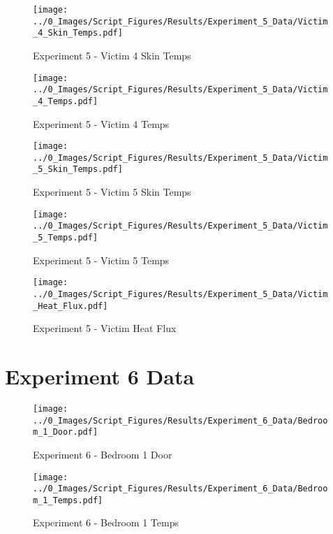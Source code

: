 	\begin{figure}[H]
		\centering
		\texttt{[image: ../0\_Images/Script\_Figures/Results/Experiment\_5\_Data/Victim\_4\_Skin\_Temps.pdf]}
		\caption[]{Experiment 5 - Victim 4 Skin Temps}
	\end{figure}
 
	\clearpage

	\begin{figure}[H]
		\centering
		\texttt{[image: ../0\_Images/Script\_Figures/Results/Experiment\_5\_Data/Victim\_4\_Temps.pdf]}
		\caption[]{Experiment 5 - Victim 4 Temps}
	\end{figure}
 

	\begin{figure}[H]
		\centering
		\texttt{[image: ../0\_Images/Script\_Figures/Results/Experiment\_5\_Data/Victim\_5\_Skin\_Temps.pdf]}
		\caption[]{Experiment 5 - Victim 5 Skin Temps}
	\end{figure}
 
	\clearpage

	\begin{figure}[H]
		\centering
		\texttt{[image: ../0\_Images/Script\_Figures/Results/Experiment\_5\_Data/Victim\_5\_Temps.pdf]}
		\caption[]{Experiment 5 - Victim 5 Temps}
	\end{figure}
 

	\begin{figure}[H]
		\centering
		\texttt{[image: ../0\_Images/Script\_Figures/Results/Experiment\_5\_Data/Victim\_Heat\_Flux.pdf]}
		\caption[]{Experiment 5 - Victim Heat Flux}
	\end{figure}
 
	\clearpage

\clearpage		\large
\section{Experiment 6 Data} \label{App:Exp6Results} 

	\begin{figure}[H]
		\centering
		\texttt{[image: ../0\_Images/Script\_Figures/Results/Experiment\_6\_Data/Bedroom\_1\_Door.pdf]}
		\caption[]{Experiment 6 - Bedroom 1 Door}
	\end{figure}
 

	\begin{figure}[H]
		\centering
		\texttt{[image: ../0\_Images/Script\_Figures/Results/Experiment\_6\_Data/Bedroom\_1\_Temps.pdf]}
		\caption[]{Experiment 6 - Bedroom 1 Temps}
	\end{figure}
 
